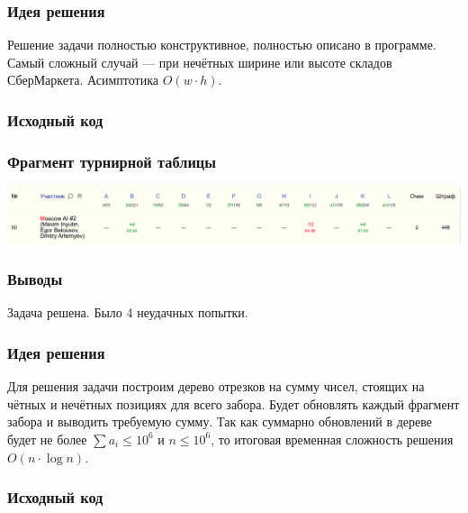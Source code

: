 
\subsubsection*{Идея решения}
Решение задачи полностью конструктивное, полностью описано в программе. Самый сложный случай --- при нечётных ширине или высоте складов СберМаркета. Асимптотика $O(w \cdot h)$.
\subsubsection*{Исходный код}

\subsubsection*{Фрагмент турнирной таблицы}
\includegraphics[width=\textwidth]{images/rucode.png}\newline\noindent
\subsubsection*{Выводы}
Задача решена. Было 4 неудачных попытки.
\pagebreak


\subsubsection*{Идея решения}
Для решения задачи построим дерево отрезков на сумму чисел, стоящих на чётных и нечётных позициях для всего забора. Будет обновлять каждый фрагмент забора и выводить требуемую сумму. Так как суммарно обновлений в дереве будет не более $\sum a_i \leqslant 10 ^ 6$ и $n \leqslant 10 ^ 6$, то итоговая временная сложность решения $O(n \cdot \log{n})$.
\subsubsection*{Исходный код}

